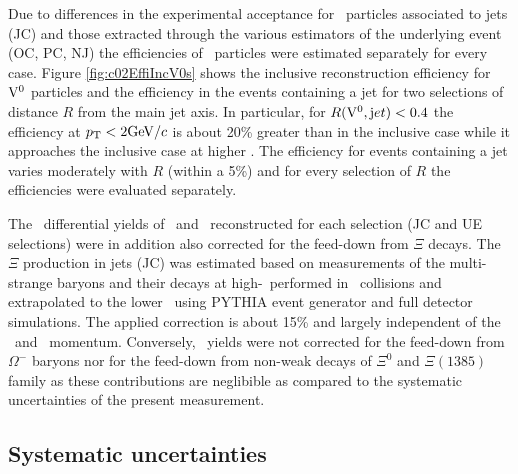 Due to differences in the experimental acceptance for \Vzero\ particles associated to jets (JC) and those extracted through the various estimators of the underlying event (OC, PC, NJ) the efficiencies of \Vzero\ particles were estimated separately for every case. Figure \ref{fig:c02EffiIncV0s} shows the inclusive reconstruction efficiency for ${\rm V}^{0}$ particles and the efficiency in the events containing a jet for two selections of distance $R$ from the main jet axis. In particular, for $R({\rm V}^0,{\mathrm jet})<0.4$ the efficiency at $p_{\mathrm{T}}<2\mathrm{GeV}/c$ is about 20\% greater than in the inclusive case while it approaches the inclusive case at higher \pt. The efficiency for events containing a jet varies moderately with $R$ (within a 5\%) and for every selection of $R$ the efficiencies were evaluated separately. 


The \pt\ differential yields of \lda\ and \alda\ reconstructed for each selection (JC and UE selections) were in addition also corrected for the feed-down from $\Xi$ decays. 
The $\Xi$ production in jets (JC) was estimated based on measurements of the multi-strange baryons and their decays at high-\pt\ performed in \pp\ collisions \cite{Abelev:2012jp} and extrapolated to the lower \pt\ using PYTHIA event generator and full detector simulations.
The applied correction is about 15\% and largely independent of the \lda\ and \alda\ momentum. 
Conversely, \lda\ yields were not corrected for the feed-down from $\Omega^{-}$ baryons nor for the feed-down from non-weak decays of $\Xi^{0}$ and $\Xi(1385)$ family as these contributions are neglibible as compared to the systematic uncertainties of the present measurement.


\subsection{Systematic uncertainties}
\label{sec:uncertainties}

